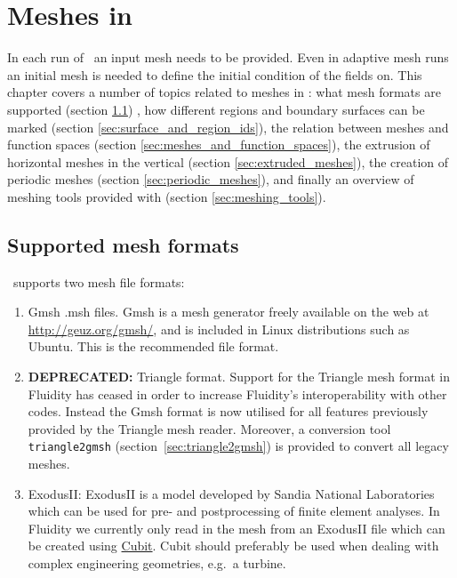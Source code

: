 \chapter{Meshes in \fluidity}\label{chap:meshes}

In each run of \fluidity\ an input mesh needs to 
be provided. Even in adaptive mesh runs an initial mesh is needed
to define the initial condition of the fields on. 
This chapter covers a number of topics 
related to meshes in \fluidity:  what
mesh formats are supported (section \ref{sec:supported_mesh_formats})
, how different regions and boundary surfaces can be
marked (section \ref{sec:surface_and_region_ids}), 
the relation between meshes and function spaces (section
\ref{sec:meshes_and_function_spaces}), the extrusion of 
horizontal meshes in the vertical (section \ref{sec:extruded_meshes}), 
the creation of periodic meshes (section \ref{sec:periodic_meshes}),
and finally an overview of meshing tools provided with \fluidity (section
\ref{sec:meshing_tools}).

\section{Supported mesh formats}
\label{sec:supported_mesh_formats}
\fluidity\ supports two mesh file formats:
\begin{enumerate}
\item Gmsh .msh files. Gmsh is a mesh generator freely available on the
web at \url{http://geuz.org/gmsh/}, and is included in Linux distributions 
such as Ubuntu. This is the recommended file format.
\item {\bf DEPRECATED:} Triangle format. Support for the Triangle mesh
  format in Fluidity has ceased in order to increase Fluidity's
  interoperability with other codes. Instead the Gmsh format is now
  utilised for all features previously provided by the Triangle mesh
  reader. Moreover, a conversion tool \lstinline+triangle2gmsh+
  (section~\ref{sec:triangle2gmsh}) is provided to convert all legacy
  meshes.
\item ExodusII: ExodusII is a model developed by Sandia National Laboratories 
which can be used for pre- and postprocessing of finite element analyses. 
In Fluidity we currently only read in the mesh from an ExodusII file which 
can be created using \href{http://cubit.sandia.gov/}{Cubit}. Cubit should 
preferably be used when dealing with complex engineering geometries, e.g.~a 
turbine.
\end{enumerate}


